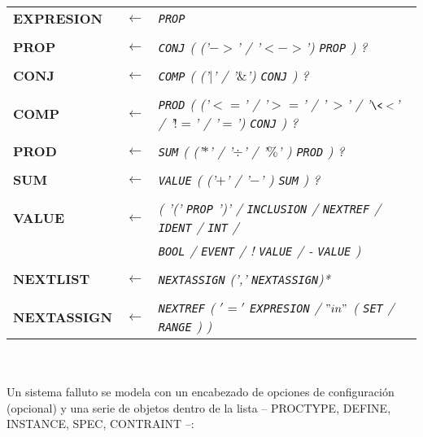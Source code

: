 \documentclass[titlepage, 12pt]{book}
\begin{document}
\noindent \begin{longtable}{>{\bfseries}ll>{\itshape}l}
EXPRESION & $\longleftarrow$ & \verb|PROP|\\\\
PROP & $\longleftarrow$ & \verb|CONJ| ( ('$->$' / '$<->$') \verb|PROP| ) ?\\\\
CONJ & $\longleftarrow$ & \verb|COMP| ( ('$|$' / '$\&$') \verb|CONJ| ) ?\\\\
COMP & $\longleftarrow$ & \verb|PROD| ( ('$<=$' / '$>=$' / '$\>>$' / '$\<<$' / '$!=$' / '$=$') \verb|CONJ| ) ?\\\\
PROD & $\longleftarrow$ & \verb|SUM| ( ('$*$' / '$\div$' / '$\%$' ) \verb|PROD| ) ?\\\\
SUM & $\longleftarrow$ & \verb|VALUE| ( ('$+$' / '$-$' ) \verb|SUM| ) ?\\\\
VALUE & $\longleftarrow$  & ( '(' \verb|PROP| ')' / \verb|INCLUSION| / \verb|NEXTREF| / \verb|IDENT| / \verb|INT| /\\
	  &					  &  \verb|BOOL| / \verb|EVENT| / ! \verb|VALUE| / - \verb|VALUE| ) \\\\
NEXTLIST & $\longleftarrow$  & \verb|NEXTASSIGN| (',' \verb|NEXTASSIGN|)*\\\\
NEXTASSIGN & $\longleftarrow$  & \verb|NEXTREF| ( $'='$ \verb|EXPRESION| / $"in"$ ( \verb|SET| / \verb|RANGE| ) )\\
\end{longtable}
~\\\\





Un sistema falluto se modela con un encabezado de opciones de configuraci\'on (opcional) y una serie de objetos dentro de la lista -- PROCTYPE, DEFINE, INSTANCE, SPEC, CONTRAINT --:\\\\
\end{document}
